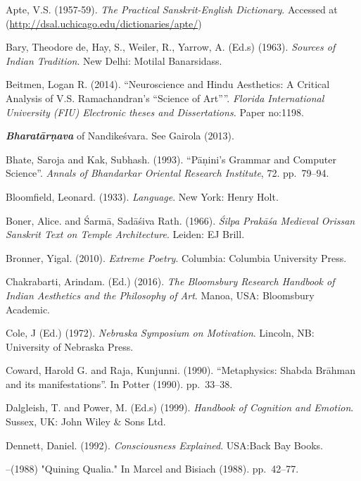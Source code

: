 \begin{thebibliography}{99}
\itemsep=2pt
Apte, V.S. (1957-59). \textsl{The Practical Sanskrit-English Dictionary}.  Accessed at (\url{http://dsal.uchicago.edu/dictionaries/apte/})

Bary, Theodore de, Hay, S., Weiler, R., Yarrow, A. (Ed.s) (1963). \textsl{Sources of Indian Tradition}. New Delhi: Motilal Banarsidass.

Beitmen, Logan R. (2014). ``Neuroscience and Hindu Aesthetics: A Critical Analysis of V.S. Ramachandran's ``Science of Art''''. \textsl{Florida International University (FIU) Electronic theses and Dissertations.} Paper no:1198.

{\sl\bfseries Bharatārṇava} of Nandikeśvara. See Gairola (2013).

Bhate, Saroja and Kak, Subhash. (1993). “Pāṇini’s Grammar and Computer Science”. \textsl{Annals of Bhandarkar Oriental Research Institute}, 72. pp.~79--94.

Bloomfield, Leonard. (1933). \textsl{Language}. New York: Henry Holt.

Boner, Alice. and Śarmā, Sadāśiva Rath. (1966). \textsl{Śilpa Prakāśa Medieval Orissan Sanskrit Text on Temple Architecture}. Leiden: EJ Brill.

Bronner, Yigal. (2010). \textsl{Extreme Poetry}. Columbia: Columbia University Press.

Chakrabarti, Arindam. (Ed.) (2016). \textsl{The Bloomsbury Research Handbook of Indian Aesthetics and the Philosophy of Art}. Manoa, USA: Bloomsbury Academic.

Cole, J (Ed.) (1972). \textsl{Nebraska Symposium on Motivation}. Lincoln, NB: University of Nebraska Press.

Coward, Harold G. and Raja, Kunjunni. (1990). “Metaphysics: Shabda Brāhman and its manifestations”. In Potter (1990). pp.~33--38.

Dalgleish, T. and Power, M. (Ed.s) (1999). \textsl{Handbook of Cognition and Emotion}. Sussex, UK: John Wiley \& Sons Ltd.

Dennett, Daniel. (1992). \textsl{Consciousness Explained}. USA:Back Bay Books.

--\kern3pt(1988) "Quining Qualia." In Marcel and Bisiach (1988). pp.~42--77.


\end{thebibliography}
